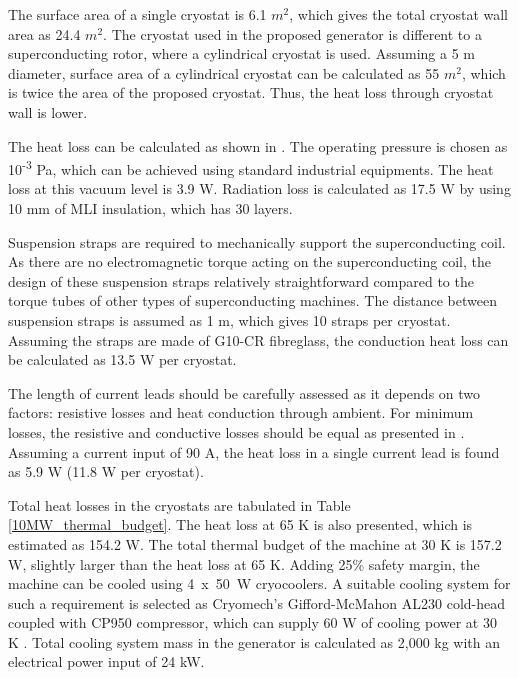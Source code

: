 \documentclass[12pt]{iopart}
\begin{document}

The surface area of a single cryostat is 6.1 $m^2$, which gives the total cryostat wall area as 24.4 $m^2$. The cryostat used in the proposed generator is different to a superconducting rotor, where a cylindrical cryostat is used. Assuming a 5 m diameter, surface area of a cylindrical cryostat can be calculated as 55 $m^2$, which is twice the area of the proposed cryostat. Thus, the heat loss through cryostat wall is lower.

The heat loss can be calculated as shown in \cite{Ekin206}. The operating pressure is chosen as 10\textsuperscript{-3} Pa, which can be achieved using standard industrial equipments. The heat loss at this vacuum level is 3.9 W. Radiation loss is calculated as 17.5 W by using 10 mm of MLI insulation, which has 30 layers.

Suspension straps are required to mechanically support the superconducting coil. As there are no electromagnetic torque acting on the superconducting coil, the design of these suspension straps relatively straightforward compared to the torque tubes of other types of superconducting machines. The distance between suspension straps is assumed as 1 m, which gives 10 straps per cryostat. Assuming the straps are made of G10-CR fibreglass, the conduction heat loss can be calculated as 13.5 W per cryostat.

The length of current leads should be carefully assessed as it depends on two factors: resistive losses and heat conduction through ambient. For minimum losses, the resistive and conductive losses should be equal as presented in \cite{Kalsi2011a}. Assuming a current input of 90 A, the heat loss in a single current lead is found as 5.9 W (11.8 W per cryostat).

Total heat losses in the cryostats are tabulated in Table \ref{10MW_thermal_budget}. The heat loss at 65 K is also presented, which is estimated as 154.2 W. The total thermal budget of the machine  at 30 K is 157.2 W, slightly larger than the heat loss at 65 K. Adding 25\% safety margin, the machine can be cooled using 4~x~50~W cryocoolers. A suitable cooling system for such a requirement is selected as Cryomech's Gifford-McMahon AL230 cold-head coupled with CP950 compressor, which can supply 60 W of cooling power at 30 K \cite{Cryomech2007}. Total cooling system mass in the generator is calculated as 2,000 kg with an electrical power input of 24 kW.
\end{document}
